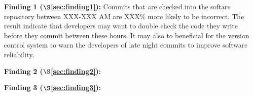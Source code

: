\begin{list}{}{\topsep=0pt\parsep=0pt\leftmargin=9pt\itemindent=0pt}

\vspace{0.05in}
  \item {\bf Finding 1 ($\S$\ref{sec:finding1}):} 
Commits that are checked into the softare repository between XXX-XXX AM  are  XXX\% more likely
to be incorrect. 
The result indicate that developers may want to double check the code they write  
before they commit between these hours. It may also to beneficial for the version control
system to warn the developers of late night commits to improve software reliability. 

\item {\bf Finding 2 ($\S$\ref{sec:finding2}):} 
\item {\bf Finding 3 ($\S$\ref{sec:finding3}):} 
\end{list}



